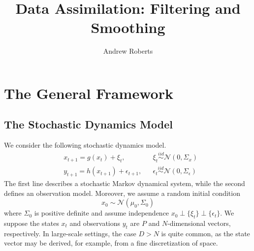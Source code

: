 \documentclass[12pt]{article}
\title{Data Assimilation: Filtering and Smoothing}
\author{Andrew Roberts}
\begin{document}
\maketitle
\tableofcontents
\newpage

\section{The General Framework}

\subsection{The Stochastic Dynamics Model}
We consider the following stochastic dynamics model. 
\begin{align}
&x_{t + 1} = g(x_t) + \xi_t, && \xi_t \overset{iid}{\sim} \mathcal{N}(0, \Sigma_x) \label{stochastic_dynamics_model} \\
&y_{t + 1} = h(x_{t+1}) + \epsilon_{t+1}, && \epsilon_t \overset{iid}{\sim} \mathcal{N}(0, \Sigma_\epsilon) \nonumber 
\end{align}
The first line describes a stochastic Markov dynamical system, while the second defines an observation model. Moreover, we assume a random initial condition 
\[x_0 \sim \mathcal{N}(\mu_0, \Sigma_0)\]
where $\Sigma_0$ is positive definite and assume independence $x_0 \perp \{\xi_t\} \perp \{\epsilon_t\}$. 
We suppose the states $x_t$ and observations $y_t$ are $P$ and $N$-dimensional vectors, respectively. 
In large-scale settings, the case $D > N$ is quite common, as the state vector may be derived, for example, from a fine discretization of space. 
\end{document}
